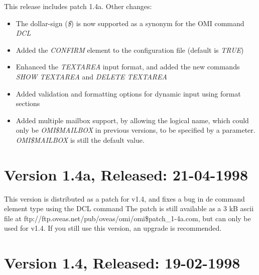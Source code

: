 \documentclass[a4paper]{book}
\begin{document}
This release includes patch 1.4a. Other changes:
\begin{itemize}
\item The dollar-sign (\textsl{{\$}}) is now supported as a synonym for the OMI command \textsl{DCL}
\item Added the \textsl{CONFIRM} element to the configuration file (default is \textsl{TRUE})
\item Enhanced the \textsl{TEXTAREA} input format, and added the new commands \textsl{SHOW TEXTAREA} and \textsl{DELETE TEXTAREA}
\item Added validation and formatting options for dynamic input using format sections
\item Added multiple mailbox support, by allowing the logical name, which could only be \textsl{OMI{\$}MAILBOX} in previous versions, to be specified by a parameter. \textsl{OMI{\$}MAILBOX} is still the default value.
\end{itemize}

\section*{Version 1.4a, Released: 21-04-1998}
                                                                               
This version is distributed as a patch for v1.4, and fixes a bug in de command
element type using the DCL command 
The patch is still available as a 3 kB ascii file at
ftp://ftp.oveas.net/pub/oveas/omi/omi{\$}patch{\_}1-4a.com, but can only be used for
v1.4. If you still use this version, an upgrade is recommended.

\section*{Version 1.4, Released: 19-02-1998}
\end{document}

